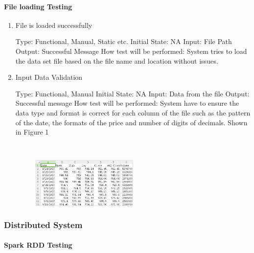 \documentclass[12pt, titlepage]{article}
\begin{document}
\paragraph{File loading Testing }

\begin{enumerate}

\item{File is loaded successfully\\}

Type: Functional, Manual, Static etc.
Initial State: NA
Input: File Path
Output: Successful Message
How test will be performed: System tries to load the data set file based on the file name and location without issues.
\item{Input Data Validation\\}

Type: Functional, Manual
Initial State: NA
Input: Data from the file
Output: Successful message
How test will be performed: System have to ensure the data type and format is correct for each column of the file such as the pattern of the date, the formats of the price and number of digits of decimals. Shown in Figure 1

~\newline
\begin{figure}[h!]
\begin{center}
{
\includegraphics[width=0.5\textwidth]{amazon.png}
}
\caption{\label{Input Data}}
\end{center}
\end{figure}

\end{enumerate}

\subsubsection{Distributed System}

\paragraph{ Spark RDD Testing}
\end{document}
